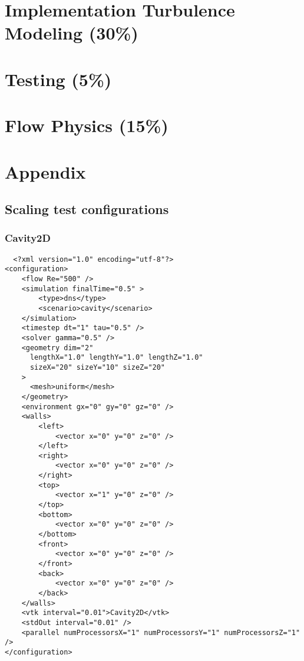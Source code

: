 \documentclass[
  english,        %
  font=palatino,     %
  onecolumn,      %
]{tumarticle}
\begin{document}
\section{Implementation Turbulence Modeling (30\%)}

\section{Testing (5\%)}

\section{Flow Physics (15\%)}

\newpage

\section*{Appendix}\label{appendix}

\subsection*{Scaling test configurations}

\subsubsection*{Cavity2D}

\begin{verbatim}
  <?xml version="1.0" encoding="utf-8"?>
<configuration>
    <flow Re="500" />
    <simulation finalTime="0.5" >
        <type>dns</type>
        <scenario>cavity</scenario>
    </simulation>
    <timestep dt="1" tau="0.5" />
    <solver gamma="0.5" />
    <geometry dim="2"
      lengthX="1.0" lengthY="1.0" lengthZ="1.0"
      sizeX="20" sizeY="10" sizeZ="20"
    >
      <mesh>uniform</mesh>
    </geometry>
    <environment gx="0" gy="0" gz="0" />
    <walls>
        <left>
            <vector x="0" y="0" z="0" />
        </left>
        <right>
            <vector x="0" y="0" z="0" />
        </right>
        <top>
            <vector x="1" y="0" z="0" />
        </top>
        <bottom>
            <vector x="0" y="0" z="0" />
        </bottom>
        <front>
            <vector x="0" y="0" z="0" />
        </front>
        <back>
            <vector x="0" y="0" z="0" />
        </back>
    </walls>
    <vtk interval="0.01">Cavity2D</vtk>
    <stdOut interval="0.01" />
    <parallel numProcessorsX="1" numProcessorsY="1" numProcessorsZ="1" />
</configuration>
\end{verbatim}
\end{document}

